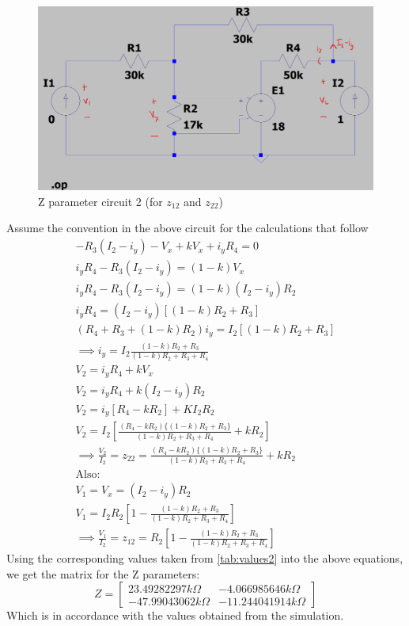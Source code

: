 \documentclass{report}[12pt]
\begin{document}
\begin{figure}[ht]
    \centering
    \includegraphics[scale=0.25]{resources/zparams2.png}
    \caption{Z parameter circuit 2 (for $z_{12}$ and $z_{22}$)}
\end{figure}
Assume the convention in the above circuit for the calculations that follow
\begin{gather*}
    -R_3(I_2-i_y)-V_x+kV_x+i_yR_4=0\\
    i_yR_4-R_3(I_2-i_y)=(1-k)V_x\\
    i_yR_4-R_3(I_2-i_y)=(1-k)(I_2-i_y)R_2\\
    i_yR_4=(I_2-i_y)[(1-k)R_2+R_3]\\
    (R_4+R_3+(1-k)R_2)i_y=I_2[(1-k)R_2+R_3]\\
    \implies i_y=I_2\frac{(1-k)R_2+R_3}{(1-k)R_2+R_3+R_4}\\
    V_2=i_yR_4+kV_x\\
    V_2=i_yR_4+k(I_2-i_y)R_2\\
    V_2=i_y[R_4-kR_2]+KI_2R_2\\
    V_2=I_2\left[\frac{(R_4-kR_2)\{(1-k)R_2+R_3\}}{(1-k)R_2+R_3+R_4}+kR_2\right]\\
    \implies \frac{V_2}{I_2} = \boxed{z_{22} = \frac{(R_4-kR_2)\{(1-k)R_2+R_3\}}{(1-k)R_2+R_3+R_4}+kR_2}\\
    \mathrm{Also:} \\
    V_1=V_x=(I_2-i_y)R_2\\
    V_1=I_2R_2\left[1-\frac{(1-k)R_2+R_3}{(1-k)R_2+R_3+R_4}\right]\\
    \implies \frac{V_1}{I_2} = \boxed{z_{12} = R_2\left[1-\frac{(1-k)R_2+R_3}{(1-k)R_2+R_3+R_4}\right]}
\end{gather*}
\newpage
Using the corresponding values taken from \hyperref[tab:values2]{\ref{tab:values2}} into the above equations, we get the matrix for the Z parameters:
$$ Z = \begin{bmatrix}
        23.49282297k\Omega  & -4.066985646k\Omega  \\
        -47.99043062k\Omega & -11.244041914k\Omega
    \end{bmatrix}
$$
Which is in accordance with the values obtained from the simulation.
\end{document}
